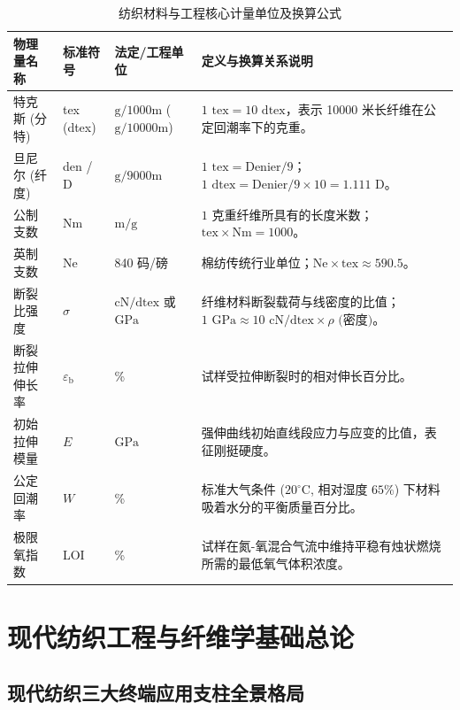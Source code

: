 \documentclass[11pt,openright,twoside,UTF8]{ctexbook}
\begin{document}
\begin{table}[htbp]
\centering
\small
\caption{纺织材料与工程核心计量单位及换算公式}
\begin{tabularx}{\textwidth}{p{2.8cm}p{2.2cm}p{3.5cm}X}
\toprule
\textbf{物理量名称} & \textbf{标准符号} & \textbf{法定/工程单位} & \textbf{定义与换算关系说明} \\
\midrule
特克斯 (分特) & tex (dtex) & $\mathrm{g/1000m}$ ($\mathrm{g/10000m}$) & $1\text{ tex} = 10\text{ dtex}$，表示 10000 米长纤维在公定回潮率下的克重。 \\
旦尼尔 (纤度) & den / D & $\mathrm{g/9000m}$ & $1\text{ tex} = \text{Denier} / 9$；$1\text{ dtex} = \text{Denier} / 9 \times 10 = 1.111\text{ D}$。 \\
公制支数 & Nm & $\mathrm{m/g}$ & $1\text{ 克重纤维所具有的长度米数}$；$\text{tex} \times \text{Nm} = 1000$。 \\
英制支数 & Ne & 840 码/磅 & 棉纺传统行业单位；$\text{Ne} \times \text{tex} \approx 590.5$。 \\
断裂比强度 & $\sigma$ & $\mathrm{cN/dtex}$ 或 $\mathrm{GPa}$ & 纤维材料断裂载荷与线密度的比值；$1\text{ GPa} \approx 10\text{ cN/dtex} \times \rho\text{ (密度)}$。 \\
断裂拉伸伸长率 & $\varepsilon_{\mathrm{b}}$ & \% & 试样受拉伸断裂时的相对伸长百分比。 \\
初始拉伸模量 & $E$ & $\mathrm{GPa}$ & 强伸曲线初始直线段应力与应变的比值，表征刚挺硬度。 \\
公定回潮率 & $W$ & \% & 标准大气条件 ($20^\circ\mathrm{C}$, 相对湿度 $65\%$) 下材料吸着水分的平衡质量百分比。 \\
极限氧指数 & LOI & \% & 试样在氮-氧混合气流中维持平稳有烛状燃烧所需的最低氧气体积浓度。 \\
\bottomrule
\end{tabularx}
\end{table}

\tableofcontents
\listoffigures
\listoftables

\mainmatter

\part{现代纺织工程与纤维学基础总论}

\chapter{现代纺织三大终端应用支柱全景格局}
\end{document}
